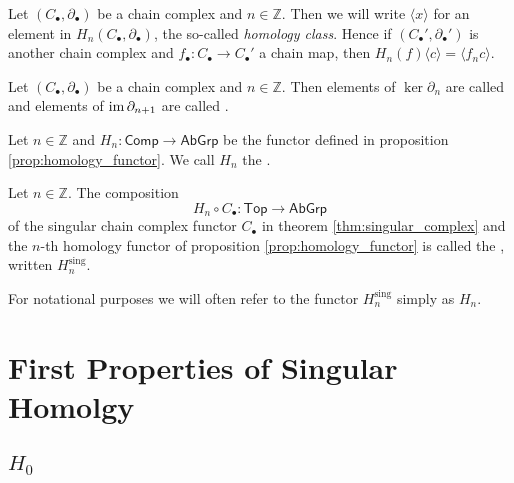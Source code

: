 \begin{remark}
	Let $(C_\bullet,\partial_\bullet)$ be a chain complex and $n \in \mathbb{Z}$. Then we will write $\langle x \rangle$ for an element in $H_n(C_\bullet,\partial_\bullet)$, the so-called \emph{homology class}. Hence if $(C_\bullet',\partial_\bullet')$ is another chain complex and $f_\bullet : C_\bullet \to C_\bullet'$ a chain map, then $H_n(f)\langle c \rangle = \langle f_nc\rangle$. 
\end{remark}

\begin{definition}
	Let $(C_\bullet,\partial_\bullet)$ be a chain complex and $n \in \mathbb{Z}$. Then elements of $\ker \partial_n$ are called  and elements of $\operatorname{im} \partial_{n + 1}$ are called .
\end{definition}

\begin{definition}
	Let $n \in \mathbb{Z}$ and $H_n : \mathsf{Comp} \to \mathsf{AbGrp}$ be the functor defined in proposition \ref{prop:homology_functor}. We call $H_n$ the .
\end{definition}

\begin{definition}
	Let $n \in \mathbb{Z}$. The composition 
	\begin{equation}
		H_n \circ C_\bullet : \mathsf{Top} \to \mathsf{AbGrp}
	\end{equation}
	\noindent of the singular chain complex functor $C_\bullet$ in theorem \ref{thm:singular_complex} and the $n$-th homology functor of proposition \ref{prop:homology_functor} is called the , written $H^{\mathrm{sing}}_n$.
\end{definition}

\begin{remark}
	For notational purposes we will often refer to the functor $H_n^{\mathrm{sing}}$ simply as $H_n$.
\end{remark}

\section*{First Properties of Singular Homolgy}
\subsection*{$H_0$}

